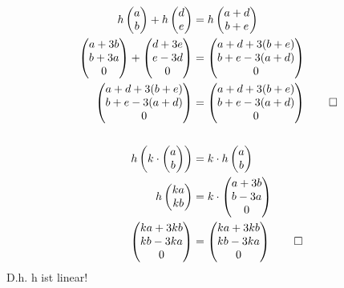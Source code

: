 \documentclass[titlepage]{article}
\newcommand{\1}{\mathbb{1}}
\newcommand{\0}{\mathbb{0}}
\begin{document}
		\begin{align*}
			h\begin{pmatrix}a\\b\end{pmatrix}
			+
			h\begin{pmatrix}d\\e\end{pmatrix}
			&=
			h\begin{pmatrix}a+d\\b+e\end{pmatrix}
			\\
			\begin{pmatrix}a+3b\\b+3a\\0\end{pmatrix}
			+
			\begin{pmatrix}d+3e\\e-3d\\0\end{pmatrix}
			&=
			\begin{pmatrix}a+d+3(b+e)\\b+e-3(a+d)\\0\end{pmatrix}
			\\
			\begin{pmatrix}a+d+3(b+e)\\b+e-3(a+d)\\0\end{pmatrix}&=\begin{pmatrix}a+d+3(b+e)\\b+e-3(a+d)\\0\end{pmatrix}\qed
			\\\\
			h\left(k\cdot\begin{pmatrix}a\\b\end{pmatrix}\right)&=k\cdot h\begin{pmatrix}a\\b\end{pmatrix}
			\\
			h\begin{pmatrix}ka\\kb\end{pmatrix}&=k\cdot \begin{pmatrix}a+3b\\b-3a\\0\end{pmatrix}
			\\
			\begin{pmatrix}ka+3kb\\kb-3ka\\0\end{pmatrix}&=\begin{pmatrix}ka+3kb\\kb-3ka\\0\end{pmatrix}\qed
		\end{align*}
		D.h. h ist linear!
\end{document}
